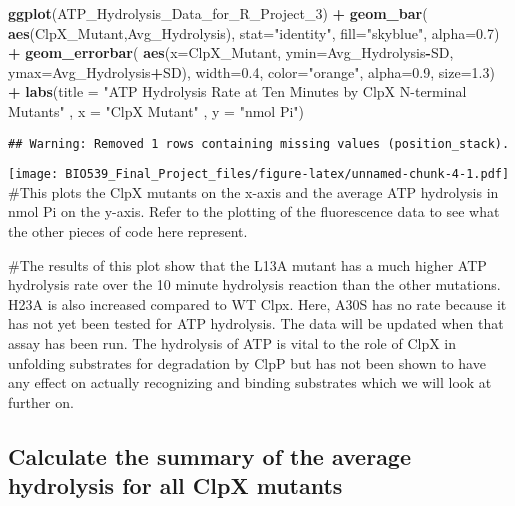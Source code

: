 \documentclass[]{article}
\newenvironment{Shaded}{\begin{snugshade}}{\end{snugshade}}
\newcommand{\DataTypeTok}[1]{\textcolor[rgb]{0.13,0.29,0.53}{#1}}
\newcommand{\DecValTok}[1]{\textcolor[rgb]{0.00,0.00,0.81}{#1}}
\newcommand{\FloatTok}[1]{\textcolor[rgb]{0.00,0.00,0.81}{#1}}
\newcommand{\KeywordTok}[1]{\textcolor[rgb]{0.13,0.29,0.53}{\textbf{#1}}}
\newcommand{\NormalTok}[1]{#1}
\newcommand{\OperatorTok}[1]{\textcolor[rgb]{0.81,0.36,0.00}{\textbf{#1}}}
\newcommand{\StringTok}[1]{\textcolor[rgb]{0.31,0.60,0.02}{#1}}
\begin{document}
\begin{Shaded}
\begin{Highlighting}[]
\KeywordTok{ggplot}\NormalTok{(ATP_Hydrolysis_Data_for_R_Project_}\DecValTok{3}\NormalTok{) }\OperatorTok{+}\StringTok{ }
\StringTok{  }\KeywordTok{geom_bar}\NormalTok{( }\KeywordTok{aes}\NormalTok{(ClpX_Mutant,Avg_Hydrolysis), }\DataTypeTok{stat=}\StringTok{"identity"}\NormalTok{, }\DataTypeTok{fill=}\StringTok{"skyblue"}\NormalTok{, }\DataTypeTok{alpha=}\FloatTok{0.7}\NormalTok{) }\OperatorTok{+}
\StringTok{  }\KeywordTok{geom_errorbar}\NormalTok{( }\KeywordTok{aes}\NormalTok{(}\DataTypeTok{x=}\NormalTok{ClpX_Mutant, }\DataTypeTok{ymin=}\NormalTok{Avg_Hydrolysis}\OperatorTok{-}\NormalTok{SD, }\DataTypeTok{ymax=}\NormalTok{Avg_Hydrolysis}\OperatorTok{+}\NormalTok{SD),}
                 \DataTypeTok{width=}\FloatTok{0.4}\NormalTok{, }\DataTypeTok{color=}\StringTok{"orange"}\NormalTok{, }\DataTypeTok{alpha=}\FloatTok{0.9}\NormalTok{, }\DataTypeTok{size=}\FloatTok{1.3}\NormalTok{) }\OperatorTok{+}
\StringTok{  }\KeywordTok{labs}\NormalTok{(}\DataTypeTok{title =} \StringTok{"ATP Hydrolysis Rate at Ten Minutes by ClpX N-terminal Mutants"}\NormalTok{ , }
       \DataTypeTok{x =} \StringTok{"ClpX Mutant"}\NormalTok{ , }\DataTypeTok{y =} \StringTok{"nmol Pi"}\NormalTok{)}
\end{Highlighting}
\end{Shaded}

\begin{verbatim}
## Warning: Removed 1 rows containing missing values (position_stack).
\end{verbatim}

\texttt{[image: BIO539\_Final\_Project\_files/figure-latex/unnamed-chunk-4-1.pdf]}
\#This plots the ClpX mutants on the x-axis and the average ATP
hydrolysis in nmol Pi on the y-axis. Refer to the plotting of the
fluorescence data to see what the other pieces of code here represent.

\#The results of this plot show that the L13A mutant has a much higher
ATP hydrolysis rate over the 10 minute hydrolysis reaction than the
other mutations. H23A is also increased compared to WT Clpx. Here, A30S
has no rate because it has not yet been tested for ATP hydrolysis. The
data will be updated when that assay has been run. The hydrolysis of ATP
is vital to the role of ClpX in unfolding substrates for degradation by
ClpP but has not been shown to have any effect on actually recognizing
and binding substrates which we will look at further on.

\hypertarget{calculate-the-summary-of-the-average-hydrolysis-for-all-clpx-mutants}{%
\subsection{Calculate the summary of the average hydrolysis for all ClpX
mutants}\label{calculate-the-summary-of-the-average-hydrolysis-for-all-clpx-mutants}}
\end{document}
